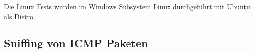 Die Linux Tests wurden im Windows Subsystem Linux durchgeführt mit Ubuntu als Distro.
\subsection{Sniffing von ICMP Paketen}

\clearpage
\pagebreak

